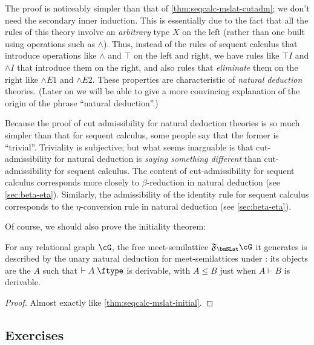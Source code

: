 \documentclass{book}
\let\types\vdash
\def\type{\;\ftype}
\newcommand{\F}[1]{\mathfrak{F}_{#1}}
\let\meet\wedge
\def\meetE{\mathord{\meet}E}
\def\meetI{\mathord{\meet}I}
\begin{document}
The proof is noticeably simpler than that of \cref{thm:seqcalc-mslat-cutadm}; we don't need the secondary inner induction.
This is essentially due to the fact that all the rules of this theory involve an \emph{arbitrary} type $X$ on the left (rather than one built using operations such as $\meet$).
Thus, instead of the rules of sequent calculus that introduce operations like $\meet$ and $\top$ on the left and right, we have rules like $\top I$ and $\meetI$ that introduce them on the right, and also rules that \emph{eliminate} them on the right like $\meetE1$ and $\meetE2$.
These properties are characteristic of \emph{natural deduction} theories.
(Later on we will be able to give a more convincing explanation of the origin of the phrase ``natural deduction''.)

\begin{rmk}
  Because the proof of cut admissibility for natural deduction theories is so much simpler than that for sequent calculus, some people say that the former is ``trivial''.
  Triviality is subjective; but what seems inarguable is that cut-admissibility for natural deduction is \emph{saying something different} than cut-admissibility for sequent calculus.
  The content of cut-admissibility for sequent calculus corresponds more closely to $\beta$-reduction in natural deduction (see \cref{sec:beta-eta}).
  Similarly, the admissibility of the identity rule for sequent calculus corresponds to the $\eta$-conversion rule in natural deduction (see \cref{sec:beta-eta}).
\end{rmk}

Of course, we should also prove the initiality theorem:

\begin{thm}\label{thm:natded-mslat-initial}
  For any relational graph $\cG$, the free meet-semilattice $\F\bmSLat \cG$ it generates is described by the unary natural deduction for meet-semilattices under \cG: its objects are the $A$ such that $\types A\type$ is derivable, with $A\le B$ just when $A\types B$ is derivable.
\end{thm}
\begin{proof}
  Almost exactly like \cref{thm:seqcalc-mslat-initial}.
\end{proof}

\subsection*{Exercises}
\end{document}
